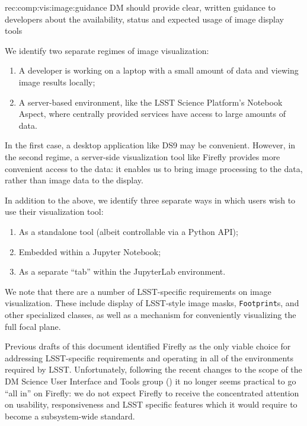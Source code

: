 \begin{recommendation}
  {rec:comp:vis:image:guidance}
  {DM should provide clear, written guidance to developers about the availability, status and expected usage of image display tools}
\end{recommendation}

We identify two separate regimes of image visualization:

\begin{enumerate}

  \item{A developer is working on a laptop with a small amount of data and viewing image results locally;}
  \item{A server-based environment, like the LSST Science Platform's Notebook Aspect, where centrally provided services have access to large amounts of data.}

\end{enumerate}

In the first case, a desktop application like DS9 may be convenient.
However, in the second regime, a server-side visualization tool like Firefly provides more convenient access to the data: it enables us to bring image processing to the data, rather than image data to the display.

In addition to the above, we identify three separate ways in which users wish to use their visualization tool:

\begin{enumerate}

  \item{As a standalone tool (albeit controllable via a Python API);}
  \item{Embedded within a Jupyter Notebook;}
  \item{As a separate ``tab'' within the JupyterLab environment.}

\end{enumerate}

We note that there are a number of LSST-specific requirements on image visualization.
These include display of LSST-style image masks, \texttt{Footprint}s, and other specialized classes, as well as a mechanism for conveniently visualizing the full focal plane.

Previous drafts of this document identified Firefly as the only viable choice for addressing LSST-specific requirements and operating in all of the environments required by LSST.
Unfortunately, following the recent changes to the scope of the DM Science User Interface and Tools group () it no longer seems practical to go ``all in'' on Firefly: we do not expect Firefly to receive the concentrated attention on usability, responsiveness and LSST specific features which it would require to become a subsystem-wide standard.

